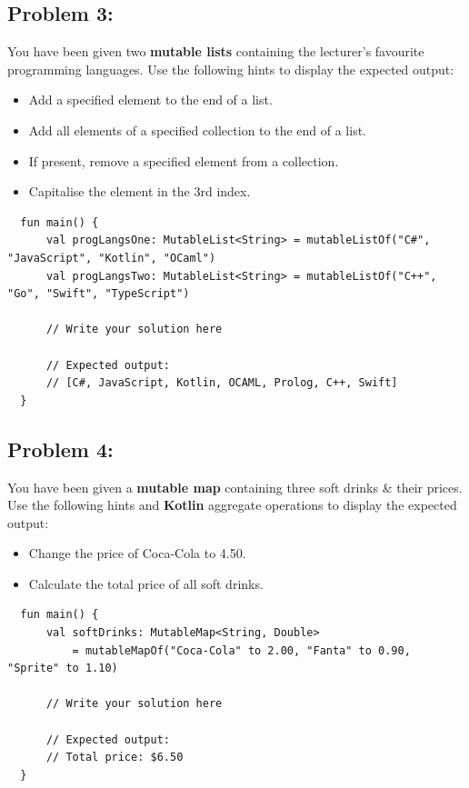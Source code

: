 \documentclass{article}
\begin{document}
\subsection*{Problem 3:} You have been given two \textbf{mutable lists} containing the lecturer's favourite programming languages. Use the following hints to display the expected output:
\begin{itemize}
  \item Add a specified element to the end of a list.
  \item Add all elements of a specified collection to the end of a list.
  \item If present, remove a specified element from a collection.
  \item Capitalise the element in the 3rd index.
\end{itemize}

\begin{verbatim}
  fun main() {
      val progLangsOne: MutableList<String> = mutableListOf("C#", "JavaScript", "Kotlin", "OCaml")
      val progLangsTwo: MutableList<String> = mutableListOf("C++", "Go", "Swift", "TypeScript")
    
      // Write your solution here
    
      // Expected output:
      // [C#, JavaScript, Kotlin, OCAML, Prolog, C++, Swift]
  }
\end{verbatim}

\subsection*{Problem 4:} You have been given a \textbf{mutable map} containing three soft drinks \& their prices. Use the following hints and \textbf{Kotlin} aggregate operations to display the expected output:
\begin{itemize}
  \item Change the price of Coca-Cola to 4.50.
  \item Calculate the total price of all soft drinks.
\end{itemize}

\begin{verbatim}
  fun main() {
      val softDrinks: MutableMap<String, Double> 
          = mutableMapOf("Coca-Cola" to 2.00, "Fanta" to 0.90, "Sprite" to 1.10)

      // Write your solution here
			
      // Expected output:
      // Total price: $6.50
  }
\end{verbatim}
\end{document}
